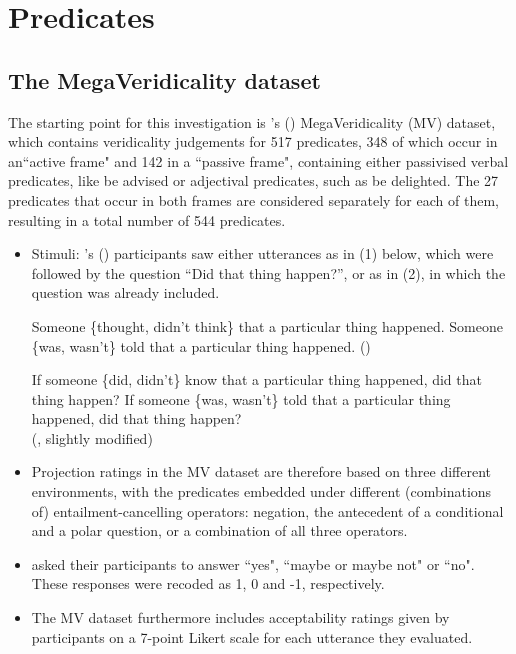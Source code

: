 \documentclass[11pt,fleqn]{article}
\newcommand{\6}{\mbox{$[\hspace*{-.6mm}[$}}
\newcommand{\9}{\mbox{$]\hspace*{-.6mm}]$}}
\newcommand{\citepos}[1]{\citeauthor{#1}'s (\citeyear{#1})}
\begin{document}
\section{Predicates}
\subsection{The MegaVeridicality dataset}
The starting point for this investigation is \citepos{white-rawlins-nels2018} MegaVeridicality (MV) dataset, which contains veridicality judgements for 517 predicates, 348 of which occur in an``active frame" and 142 in a ``passive frame", containing either passivised verbal predicates, like be advised or adjectival predicates, such as be delighted. The 27 predicates that occur in both frames are considered separately for each of them, resulting in a total number of 544 predicates. 
\begin{itemize}
	\item Stimuli: \citepos{white-rawlins-nels2018} participants saw either utterances as in (1) below, which were followed by the question “Did that thing happen?”, or as in (2), in which the question was already included.
	\begin{exe}		
		\ex 
		\begin{xlist}
			\ex Someone \{thought, didn’t think\} that a particular thing happened.
			\ex Someone \{was, wasn’t\} told that a particular thing happened. \hfill(\citealt{white-rawlins-nels2018})
		\end{xlist}
	\end{exe}

	\begin{exe}		
		\ex 
		\begin{xlist}
			\ex If someone \{did, didn’t\} know that a particular thing happened, did that thing happen?
			\ex If someone \{was, wasn’t\} told that a particular thing happened, did that thing happen? \\ \null\hfill(\citealt{white-rawlins-nels2018}, slightly modified)
		\end{xlist}
	\end{exe}
	\item Projection ratings in the MV dataset are therefore based on three different environments, with the predicates embedded under different (combinations of) entailment-cancelling operators: negation, the antecedent of a conditional and a polar question, or a combination of all three operators. 
	\item \cite{white-rawlins-nels2018} asked their participants to answer ``yes", ``maybe or maybe not" or ``no". These responses were recoded as 1, 0 and -1, respectively.
	\item The MV dataset furthermore includes acceptability ratings given by participants on a 7-point Likert scale for each utterance they evaluated.
\end{itemize}
\end{document}
